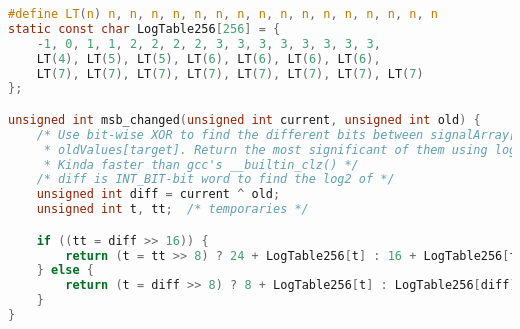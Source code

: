 \begin{lstlisting}[language=c, caption={msb\_changed()}, 
escapechar=$, label={lst:msb_changed}]
#define LT(n) n, n, n, n, n, n, n, n, n, n, n, n, n, n, n, n
static const char LogTable256[256] = {
    -1, 0, 1, 1, 2, 2, 2, 2, 3, 3, 3, 3, 3, 3, 3, 3,
    LT(4), LT(5), LT(5), LT(6), LT(6), LT(6), LT(6),
    LT(7), LT(7), LT(7), LT(7), LT(7), LT(7), LT(7), LT(7)
};

unsigned int msb_changed(unsigned int current, unsigned int old) {
    /* Use bit-wise XOR to find the different bits between signalArray[target] and
     * oldValues[target]. Return the most significant of them using log2.
     * Kinda faster than gcc's __builtin_clz() */
    /* diff is INT_BIT-bit word to find the log2 of */
    unsigned int diff = current ^ old;
    unsigned int t, tt;  /* temporaries */

    if ((tt = diff >> 16)) {
        return (t = tt >> 8) ? 24 + LogTable256[t] : 16 + LogTable256[tt];
    } else {
        return (t = diff >> 8) ? 8 + LogTable256[t] : LogTable256[diff];
    }
}
\end{lstlisting}
